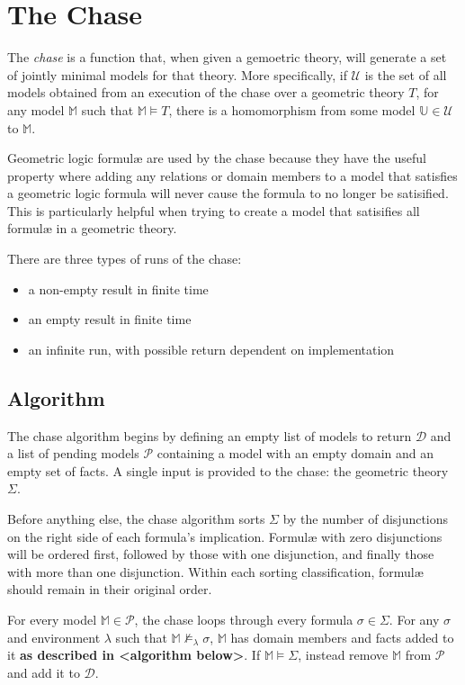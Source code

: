\section{The Chase}

	The \emph{chase} is a function that, when given a gemoetric theory, will
	generate a set of jointly minimal models for that theory. More
	specifically, if $\mathcal{U}$ is the set of all models obtained from an
	execution of the chase over a geometric theory $T$, for any model
	$\mathbb{M}$ such that $\mathbb{M} \models T$, there is a homomorphism from
	some model $\mathbb{U} \in \mathcal{U}$ to $\mathbb{M}$.

	Geometric logic formul{\ae} are used by the chase because they have the
	useful property where adding any relations or domain members to a model
	that satisfies a geometric logic formula will never cause the formula to no
	longer be satisified. This is particularly helpful when trying to create a
	model that satisifies all formul{\ae} in a geometric theory.

	There are three types of runs of the chase:
	\begin{itemize}
	\item a non-empty result in finite time
	\item an empty result in finite time
	\item an infinite run, with possible return dependent on implementation
	\end{itemize}

	\subsection{Algorithm}

		The chase algorithm begins by defining an empty list of models to
		return $\mathcal{D}$ and a list of pending models $\mathcal{P}$
		containing a model with an empty domain and an empty set of facts. A
		single input is provided to the chase: the geometric theory $\Sigma$.

		Before anything else, the chase algorithm sorts $\Sigma$ by the
		number of disjunctions on the right side of each formula's implication.
		Formul{\ae} with zero disjunctions will be ordered first, followed by
		those with one disjunction, and finally those with more than one
		disjunction. Within each sorting classification, formul{\ae} should
		remain in their original order.

		For every model $\mathbb{M} \in \mathcal{P}$, the chase loops through
		every formula $\sigma \in \Sigma$. For any $\sigma$ and environment
		$\lambda$ such that $\mathbb{M} \not\models_\lambda \sigma$,
		$\mathbb{M}$ has domain members and facts added to it \textbf{as
		described in <algorithm below>}. If $\mathbb{M} \models \Sigma$,
		instead remove $\mathbb{M}$ from $\mathcal{P}$ and add it to
		$\mathcal{D}$.

